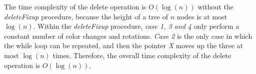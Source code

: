 \documentclass[12pt]{article}
\begin{document}
    The time complexity of the delete operation is $O(\log(n))$ without the \textit{deleteFixup} procedure, because
    the height of a tree of $n$ nodes is at most $\log(n)$. \newline
    Within the \textit{deleteFixup} procedure, \textit{case 1, 3 and 4} only perform a constant number of color changes
    and rotations. \newline
    \textit{Case 2} is the only case in which the while loop can be repeated, and then the pointer \textit{X} moves up
    the three at most $\log(n)$ times. \newline
    Therefore, the overall time complexity of the delete operation is $O(\log(n))$.
\end{document}
